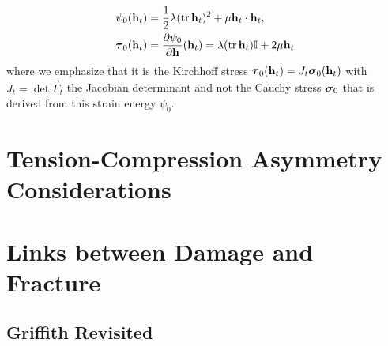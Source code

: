 \begin{align}
\psi_0(\vec{h}_t) &= \frac{1}{2}\lambda(\tr\vec{h}_t)^2+\mu\vec{h}_t\cdot\vec{h}_t, \label{eq:soundpsi} \\
\vtau_0(\vec{h}_t) &= \frac{\partial\psi_0}{\partial\vec{h}}(\vec{h}_t)=\lambda(\tr\vec{h}_t)\mathbb{I}+2\mu\vec{h}_t \label{eq:henckystress}
\end{align}
where we emphasize that it is the Kirchhoff stress $\vtau_0(\vec{h}_t)=J_t\sig_0(\vec{h}_t)$ with $J_t=\det\vec{F}_t$ the Jacobian determinant and not the Cauchy stress $\sig_0$ that is derived from this strain energy $\psi_0$.

\section{Tension-Compression Asymmetry Considerations}

\section{Links between Damage and Fracture}

\subsection{Griffith Revisited}
